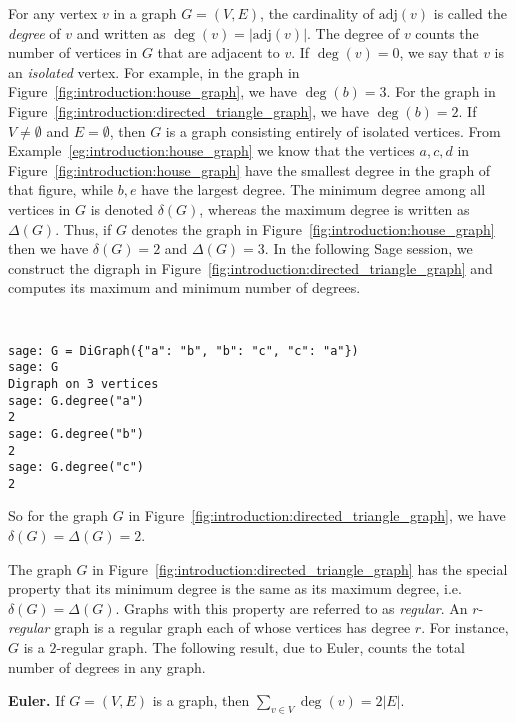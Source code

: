 For any vertex $v$ in a graph $G = (V, E)$, the cardinality of
$\text{adj}(v)$ is called the \emph{degree} of $v$ and written as
$\deg(v) = |\text{adj}(v)|$. The degree of $v$ counts the number of
vertices in $G$ that are adjacent to $v$. If $\deg(v) = 0$, we say
that $v$ is an \emph{isolated} vertex. For example, in the graph in
Figure~\ref{fig:introduction:house_graph}, we have $\deg(b) = 3$. For
the graph in Figure~\ref{fig:introduction:directed_triangle_graph}, we
have $\deg(b) = 2$. If $V \neq \emptyset$ and $E = \emptyset$, then
$G$ is a graph consisting entirely of isolated vertices. From
Example~\ref{eg:introduction:house_graph} we know that the vertices
$a, c, d$ in Figure~\ref{fig:introduction:house_graph} have the
smallest degree in the graph of that figure, while $b, e$ have the
largest degree. The minimum degree among all vertices in $G$ is
denoted $\delta(G)$, whereas the maximum degree is written as
$\Delta(G)$. Thus, if $G$ denotes the graph in
Figure~\ref{fig:introduction:house_graph} then we have $\delta(G) = 2$
and $\Delta(G) = 3$. In the following Sage session, we construct the
digraph in Figure~\ref{fig:introduction:directed_triangle_graph} and
computes its maximum and minimum number of degrees.
\index{$\delta$}
\index{$\Delta$}
%
\begin{center}
\fontsize{9pt}{9pt}
\selectfont
\tt
\begin{lstlisting}
sage: G = DiGraph({"a": "b", "b": "c", "c": "a"})
sage: G
Digraph on 3 vertices
sage: G.degree("a")
2
sage: G.degree("b")
2
sage: G.degree("c")
2
\end{lstlisting}
\end{center}
%
So for the graph $G$ in
Figure~\ref{fig:introduction:directed_triangle_graph}, we have
$\delta(G) = \Delta(G) = 2$.

The graph $G$ in Figure~\ref{fig:introduction:directed_triangle_graph}
has the special property that its minimum degree is the same as its
maximum degree, i.e. $\delta(G) = \Delta(G)$. Graphs with this
property are referred to as \emph{regular}. An $r$-\emph{regular}
graph is a regular graph each of whose vertices has degree $r$. For
instance, $G$ is a $2$-regular graph. The following result, due to
Euler, counts the total number of degrees in any graph.

\begin{theorem}
\label{thm:introduction:degree_sum}
\label{thm:introduction:hand_shaking}
\textbf{Euler.}
If $G = (V, E)$ is a graph, then $\sum_{v \in V} \deg(v) = 2 |E|$.
\end{theorem}

